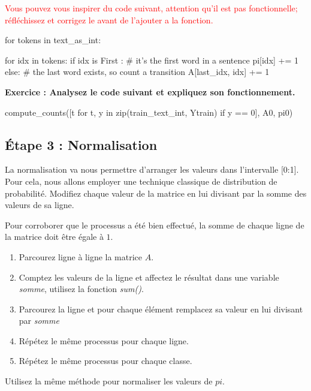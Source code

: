 \textcolor{red}{Vous pouvez vous inspirer du code suivant, attention qu'il est pas fonctionnelle; réfléchissez et corrigez le avant de l'ajouter a la fonction.}

\begin{python}
for tokens in text_as_int:

 for idx in tokens:
 if idx is First :
  # it's the first word in a sentence
  pi[idx] += 1
 else:
  # the last word exists, so count a transition
  A[last_idx, idx] += 1

\end{python}

\textbf{Exercice :
Analysez le code suivant et expliquez son fonctionnement.}
\begin{python}
compute_counts([t for t, y in zip(train_text_int, Ytrain)
 if y == 0], A0, pi0)
\end{python}
\vspace{5cm}


\subsection{Étape 3 : Normalisation}

La normalisation va nous permettre d'arranger les valeurs dans l'intervalle [0:1]. Pour cela, nous allons employer une technique classique de distribution de probabilité. Modifiez chaque valeur de la matrice en lui divisant par la somme des valeurs de sa ligne.

Pour corroborer que le processus a été bien effectué, la somme de chaque ligne de la matrice doit être égale à $1$.

\begin{enumerate}
	\item Parcourez ligne à ligne la matrice $A$.
	\item Comptez les valeurs de la ligne et affectez le résultat dans une variable \textit{somme}, utilisez la fonction \textit{sum()}.
	\item Parcourez la ligne et pour chaque élément remplacez sa valeur en lui divisant par \textit{somme}
	\item Répétez le même processus pour chaque ligne.
	\item Répétez le même processus pour chaque classe.
\end{enumerate}
Utilisez la même méthode pour normaliser les valeurs de $pi$.


